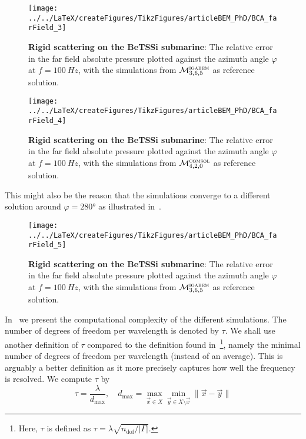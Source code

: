 \begin{figure}
	\centering
	\texttt{[image: ../../LaTeX/createFigures/TikzFigures/articleBEM\_PhD/BCA\_farField\_3]}
	\caption{\textbf{Rigid scattering on the BeTSSi submarine}: The relative error in the far field absolute pressure plotted against the azimuth angle $\varphi$ at $f = \SI{100}{Hz}$, with the simulations from ${\cal M}_{3,6,5}^{\textsc{igabem}}$ as reference solution.}
	\label{Fig3:error_BI_100_IGA}
\end{figure}
\begin{figure}
	\centering
	\texttt{[image: ../../LaTeX/createFigures/TikzFigures/articleBEM\_PhD/BCA\_farField\_4]}
	\caption{\textbf{Rigid scattering on the BeTSSi submarine}: The relative error in the far field absolute pressure plotted against the azimuth angle $\varphi$ at $f = \SI{100}{Hz}$, with the simulations from ${\cal M}_{4,2,0}^{\textsc{comsol}}$ as reference solution.}
	\label{Fig3:error_BI_100_COMSOL}
\end{figure}
This might also be the reason that the \COMSOL simulations converge to a different solution around $\varphi=\ang{280}$ as illustrated in~.
\begin{figure}
	\centering
	\texttt{[image: ../../LaTeX/createFigures/TikzFigures/articleBEM\_PhD/BCA\_farField\_5]}
	\caption{\textbf{Rigid scattering on the BeTSSi submarine}: The relative error in the far field absolute pressure plotted against the azimuth angle $\varphi$ at $f = \SI{100}{Hz}$, with the simulations from ${\cal M}_{3,6,5}^{\textsc{igabem}}$ as reference solution.}
	\label{Fig3:error_BI_100_COMSOL_IGA}
\end{figure}
In~ we present the computational complexity of the different simulations. The number of degrees of freedom per wavelength is denoted by $\tau$. We shall use another definition of $\tau$ compared to the definition found in~\cite[p. 767]{Peake2015eib}\footnote{Here, $\tau$ is defined as $\tau = \lambda\sqrt{n_{\mathrm{dof}}/|\Gamma|}$.}, namely the minimal number of degrees of freedom per wavelength (instead of an average). This is arguably a better definition as it more precisely captures how well the frequency is resolved. We compute $\tau$ by
\begin{equation*}
	\tau=\frac{\lambda}{d_{\mathrm{max}}},\quad d_{\mathrm{max}} = \max_{\vec{x}\in X}\min_{\vec{y}\in X\setminus\vec{x}}\|\vec{x}-\vec{y}\|
\end{equation*}
